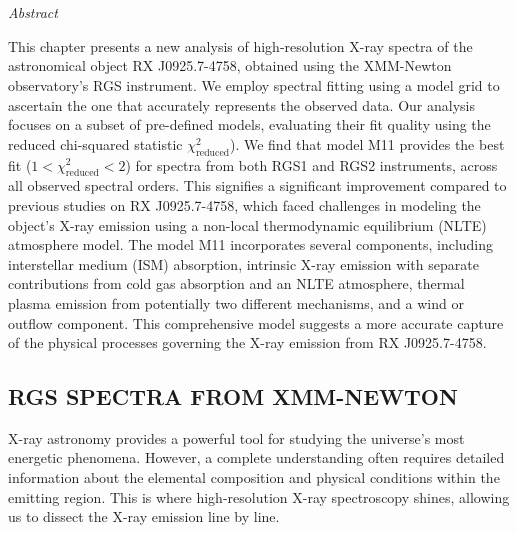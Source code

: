 \chapter{\MakeUppercase{\ChapterTitleFour}} \label{chap:hi-resolution}
    \minitoc
    
    \newpage
    \begin{center}
    	\emph{Abstract}
    \end{center}
    This chapter presents a new analysis of high-resolution X-ray spectra of the astronomical object RX J0925.7-4758, obtained using the XMM-Newton observatory's RGS instrument. We employ spectral fitting using a model grid to ascertain the one that accurately represents the observed data. Our analysis focuses on a subset of pre-defined models, evaluating their fit quality using the reduced chi-squared statistic $\chi^2_\text{reduced}$). We find that model M11 provides the best fit ($1<\chi^2_\text{reduced}<2$) for spectra from both RGS1 and RGS2 instruments, across all observed spectral orders. This signifies a significant improvement compared to previous studies on RX J0925.7-4758, which faced challenges in modeling the object's X-ray emission using a non-local thermodynamic equilibrium (NLTE) atmosphere model. The model M11 incorporates several components, including interstellar medium (ISM) absorption, intrinsic X-ray emission with separate contributions from cold gas absorption and an NLTE atmosphere, thermal plasma emission from potentially two different mechanisms, and a wind or outflow component. This comprehensive model suggests a more accurate capture of the physical processes governing the X-ray emission from RX J0925.7-4758.

	\newpage
	\section{\MakeUppercase{RGS Spectra from XMM-Newton}} \label{hi-resolution:rgs-spec}
		X-ray astronomy provides a powerful tool for studying the universe's most energetic phenomena. However, a complete understanding often requires detailed information about the elemental composition and physical conditions within the emitting region. This is where high-resolution X-ray spectroscopy shines, allowing us to dissect the X-ray emission line by line.
		
